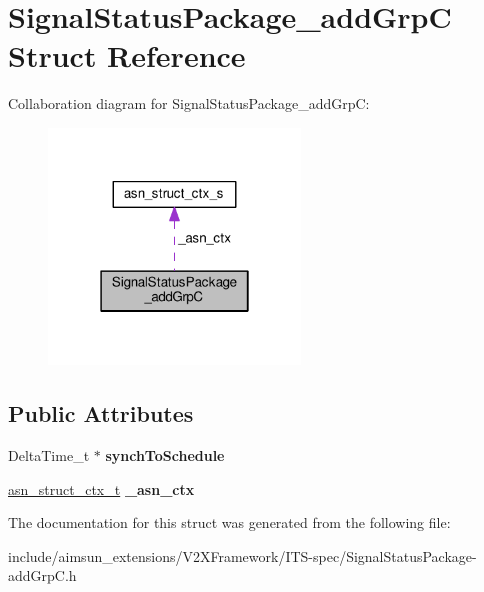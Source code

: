 \hypertarget{structSignalStatusPackage__addGrpC}{}\section{Signal\+Status\+Package\+\_\+add\+GrpC Struct Reference}
\label{structSignalStatusPackage__addGrpC}


Collaboration diagram for Signal\+Status\+Package\+\_\+add\+GrpC\+:\nopagebreak
\begin{figure}[H]
\begin{center}
\leavevmode
\includegraphics[width=190pt]{structSignalStatusPackage__addGrpC__coll__graph}
\end{center}
\end{figure}
\subsection*{Public Attributes}
\begin{DoxyCompactItemize}
\item 
Delta\+Time\+\_\+t $\ast$ {\bfseries synch\+To\+Schedule}\hypertarget{structSignalStatusPackage__addGrpC_a7619812721f0b82bc9d69b545ee655e8}{}\label{structSignalStatusPackage__addGrpC_a7619812721f0b82bc9d69b545ee655e8}

\item 
\hyperlink{structasn__struct__ctx__s}{asn\+\_\+struct\+\_\+ctx\+\_\+t} {\bfseries \+\_\+asn\+\_\+ctx}\hypertarget{structSignalStatusPackage__addGrpC_ace4e864222a11984749737707843fe89}{}\label{structSignalStatusPackage__addGrpC_ace4e864222a11984749737707843fe89}

\end{DoxyCompactItemize}


The documentation for this struct was generated from the following file\+:\begin{DoxyCompactItemize}
\item 
include/aimsun\+\_\+extensions/\+V2\+X\+Framework/\+I\+T\+S-\/spec/Signal\+Status\+Package-\/add\+Grp\+C.\+h\end{DoxyCompactItemize}
